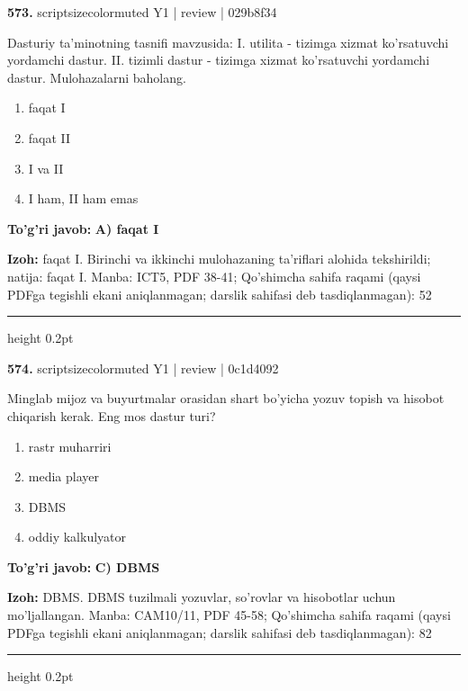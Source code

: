 \documentclass[10pt,a4paper]{article}
\begin{document}
{\bfseries\sffamily\color{ink} 573.} {scriptsizecolor{muted} Y1 | review | 029b8f34}
\par
Dasturiy ta'minotning tasnifi mavzusida: I. utilita - tizimga xizmat ko'rsatuvchi yordamchi dastur. II. tizimli dastur - tizimga xizmat ko'rsatuvchi yordamchi dastur. Mulohazalarni baholang.
\begin{enumerate}[label=\Alph*),leftmargin=9mm]
\item faqat I
\item faqat II
\item I va II
\item I ham, II ham emas
\end{enumerate}
\begin{tcolorbox}[enhanced,breakable,colback=teal!4,colframe=teal!60!black,boxrule=0.45pt,arc=1.2mm,left=2.7mm,right=2.7mm,top=1.8mm,bottom=1.8mm,before skip=2mm,after skip=2mm]
{\bfseries\sffamily\color{teal}To'g'ri javob:} \textbf{A) faqat I}
\par\smallskip
{\bfseries Izoh:} faqat I. Birinchi va ikkinchi mulohazaning ta'riflari alohida tekshirildi; natija: faqat I. Manba: ICT5, PDF 38-41; Qo'shimcha sahifa raqami (qaysi PDFga tegishli ekani aniqlanmagan; darslik sahifasi deb tasdiqlanmagan): 52
\end{tcolorbox}
\vspace{2mm}\hrule height 0.2pt\vspace{3mm}

{\bfseries\sffamily\color{ink} 574.} {scriptsizecolor{muted} Y1 | review | 0c1d4092}
\par
Minglab mijoz va buyurtmalar orasidan shart bo'yicha yozuv topish va hisobot chiqarish kerak. Eng mos dastur turi?
\begin{enumerate}[label=\Alph*),leftmargin=9mm]
\item rastr muharriri
\item media player
\item DBMS
\item oddiy kalkulyator
\end{enumerate}
\begin{tcolorbox}[enhanced,breakable,colback=teal!4,colframe=teal!60!black,boxrule=0.45pt,arc=1.2mm,left=2.7mm,right=2.7mm,top=1.8mm,bottom=1.8mm,before skip=2mm,after skip=2mm]
{\bfseries\sffamily\color{teal}To'g'ri javob:} \textbf{C) DBMS}
\par\smallskip
{\bfseries Izoh:} DBMS. DBMS tuzilmali yozuvlar, so'rovlar va hisobotlar uchun mo'ljallangan. Manba: CAM10/11, PDF 45-58; Qo'shimcha sahifa raqami (qaysi PDFga tegishli ekani aniqlanmagan; darslik sahifasi deb tasdiqlanmagan): 82
\end{tcolorbox}
\vspace{2mm}\hrule height 0.2pt\vspace{3mm}
\end{document}
